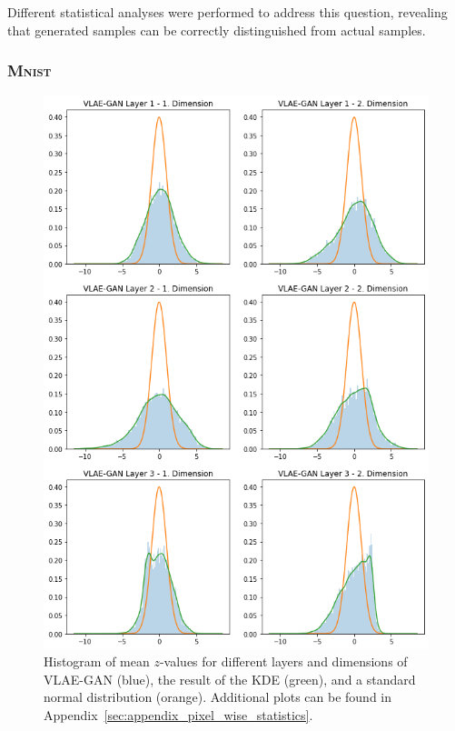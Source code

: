 Different statistical analyses were performed to address this question, revealing that generated samples can be correctly distinguished from actual samples.

\subsubsection{\textsc{Mnist}}\label{subsubsec:pixel_wise_distribution_mnist}

\begin{figure}
    \centering
    \includegraphics[width=.8\textwidth]{images/generated_vs_true/vlae_gan_kde.png}
    \caption[\ac{VLAE}-GAN - Latent Space Distribution]{Histogram of mean $z$-values for different layers and dimensions of \ac{VLAE}-\ac{GAN} (blue), the result of the \ac{KDE} (green), and a standard normal distribution (orange). Additional plots can be found in Appendix~\ref{sec:appendix_pixel_wise_statistics}.}
    \label{fig:vlae_gan_kde}
\end{figure}


